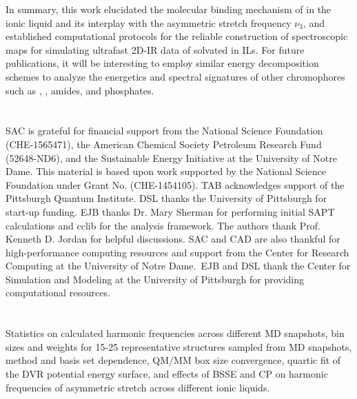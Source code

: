 In summary, this work elucidated the molecular binding mechanism of  in the \ce{[C4C1im][PF6]} ionic liquid and its interplay with the  asymmetric stretch frequency \(\nu_{3}\), and established computational protocols for the reliable construction of spectroscopic maps for simulating ultrafast 2D-IR data of  solvated in ILs. For future publications, it will be interesting to employ similar energy decomposition schemes to analyze the energetics and spectral signatures of other chromophores such as , , amides, and phosphates.

\section{\texorpdfstring{}{Acknowledgements}}

SAC is grateful for financial support from the National Science Foundation (CHE-1565471), the American Chemical Society Petroleum Research Fund (52648-ND6), and the Sustainable Energy Initiative at the University of Notre Dame. This material is based upon work supported by the National Science Foundation under Grant No. (CHE-1454105). TAB acknowledges support of the Pittsburgh Quantum Institute. DSL thanks the University of Pittsburgh for start-up funding. EJB thanks Dr. Mary Sherman for performing initial SAPT calculations and cclib\cite{OBoyle2008,Berquist2015} for the analysis framework. The authors thank Prof. Kenneth D. Jordan for helpful discussions. SAC and CAD are also thankful for high-performance computing resources and support from the Center for Research Computing at the University of Notre Dame.~EJB and DSL thank the Center for Simulation and Modeling at the University of Pittsburgh for providing computational resources.

\section{\texorpdfstring{}{Supporting Information}}
\label{paper_02:sec:SI}

Statistics on calculated harmonic frequencies across different MD snapshots, bin sizes and weights for 15-25 representative structures sampled from MD snapshots, method and basis set dependence, QM/MM box size convergence, quartic fit of the DVR potential energy surface, and effects of BSSE and CP on harmonic frequencies of  asymmetric stretch across different ionic liquids.


